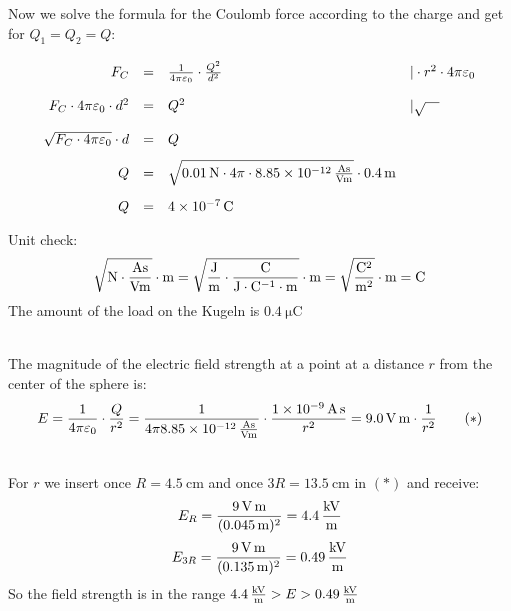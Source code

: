 \documentclass[a4paper]{article}
\begin{document}
	\noindent Now we solve the formula for the Coulomb force according to the charge and get for $Q_1=Q_2=Q$:
	$$
	\renewcommand{\arraystretch}{2}
	\begin{array}{rcll}
		F_C & = & {1 \over 4 \pi \varepsilon_0}\cdot {Q^2 \over d^2} & | \cdot r^2 \cdot 4 \pi \varepsilon_0 \\
		F_C \cdot 4 \pi \varepsilon_0 \cdot d^2 & = & Q^2 & | \sqrt{\quad}\\
		\sqrt{F_C \cdot 4 \pi \varepsilon_0}\cdot d & = & Q \\
		Q & = & \sqrt{\SI{0.01}{\newton} \cdot 4 \pi \cdot\SI{8.85e-12}{\ampere\second \over \volt\meter}} \cdot \SI{0,4}{\meter} \\
		Q & = & \SI{4e-7}{\coulomb}
	\end{array}
	$$
	Unit check:
	$$\sqrt{\SI{}{\newton \cdot {\ampere\second\over \volt\meter}}} \cdot \SI{}{\meter} = \sqrt{\SI{}{{\joule \over \meter} \cdot {\coulomb \over \joule \cdot \coulomb^{-1}\cdot \meter}}} \cdot \SI{}{\meter} = \sqrt{ \SI{}{{ \coulomb^2} \over {\meter^2}}} \cdot \SI{}{\meter} = \SI{}{\coulomb}$$
	The amount of the load on the Kugeln is $0.4\SI{}{\micro \coulomb}$
	\vspace{0.5 cm}
	
	\\
	The magnitude of the electric field strength at a point at a distance $r$ from the center of the sphere is:
	$$ E = {1 \over 4 \pi \varepsilon_0}\cdot {Q \over r^2} =
	{1 \over 4 \pi \SI{8.85e-12}{\ampere\second\over \volt\meter}}\cdot {\SI{1e-9}{\ampere\second} \over r^2 }= \SI{9,0}{\volt\meter} \cdot{1 \over r^2} \qquad (*)$$
	\vspace{0.5 cm}
	
	\\
	For $r$ we insert once $R=\SI{4,5}{\centi\meter}$ and once $3R=\SI{13,5}{\centi\meter}$ in $(*)$ and receive:
	$$ E_R = {\SI{9}{\volt\meter} \over (\SI{0.045}{\meter})^2}= \SI{4.4}{\kilo\volt\over\meter} $$
	$$ E_{3R} = {\SI{9}{\volt\meter} \over (\SI{0.135}{\meter})^2}= \SI{0.49}{\kilo\volt\over \meter}$$
	So the field strength is in the range $\SI{4.4}{\kilo\volt\over\meter} > E > \SI{0.49}{\kilo\volt\over\meter}$
	\vspace{1cm}
	
\end{document}
